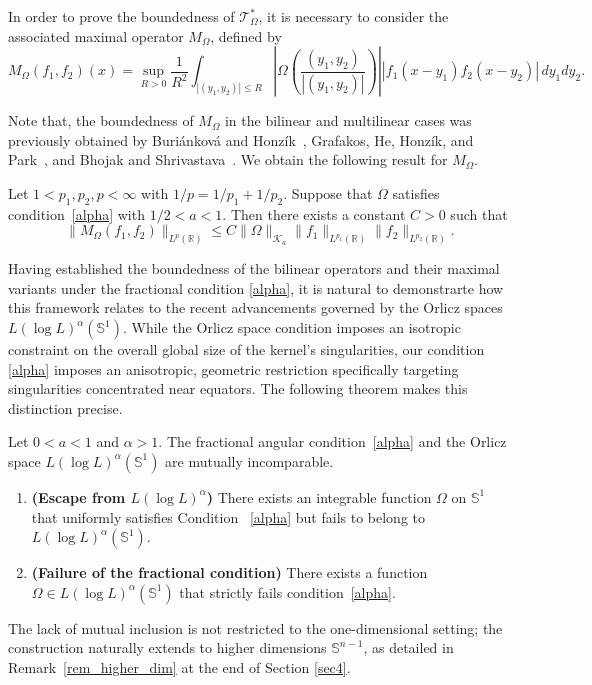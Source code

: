 \documentclass[11pt]{amsart}
\begin{document}
In order to prove the boundedness of $\mathcal {T}_\Omega^*$, it is necessary to consider the associated maximal operator $M_\Omega$, defined by
\[
M_\Omega(f_1, f_2)(x) = \sup_{R>0} \frac{1}{R^2} \int_{|(y_1, y_2)|
	\le R} \left| \Omega\left(\frac{(y_1, y_2)}{|(y_1, y_2)|}\right) \right| |f_1(x-y_1) f_2(x-y_2)| \, dy_1 dy_2.
\]

Note that, the boundedness of $M_\Omega$ in the bilinear and multilinear cases was previously obtained by Buri\'ankov\'a and Honz\'ik~\cite{BH19}, Grafakos, He, Honz\'ik, and Park~\cite{GHHP2024}, and Bhojak and Shrivastava~\cite{bhojak2025alternate}. 
We obtain the following result for $M_\Omega$.

\begin{theorem}\label{thmmax}
	Let $1 < p_1, p_2, p < \infty$ with $1/p = 1/p_1 + 1/p_2$.
	Suppose that $\Omega$ satisfies condition~\eqref{alpha} with $1/2 < a < 1$.
	Then there exists a constant $C > 0$ such that
	\[
	\|M_\Omega(f_1, f_2)\|_{L^p(\mathbb{R})} \le C \|\Omega\|_{\mathcal{K}_a} \|f_1\|_{L^{p_1}(\mathbb{R})} \|f_2\|_{L^{p_2}(\mathbb{R})}.
	\]
\end{theorem}

Having established the boundedness of the bilinear operators and their maximal variants under the fractional condition \eqref{alpha}, it is natural to demonstrarte how this framework relates to the recent advancements governed by the Orlicz spaces $L(\log L)^\alpha(\mathbb{S}^{1})$. While the Orlicz space condition imposes an isotropic constraint on the overall global size of the kernel's singularities, our condition \eqref{alpha} imposes an anisotropic, geometric restriction specifically targeting singularities concentrated near equators. The following theorem makes this distinction precise.

\begin{theorem}\label{thmincomparability}
	Let $0 < a < 1$ and $\alpha > 1$.
	The fractional angular condition~\eqref{alpha} and the Orlicz space $L(\log L)^\alpha(\mathbb{S}^{1})$ are mutually incomparable.
	\begin{enumerate}
		\item[\rm(i)] \textbf{(Escape from $L(\log L)^\alpha$)} There exists an integrable function $\Omega$ on $\mathbb{S}^{1}$ that uniformly satisfies Condition ~\eqref{alpha} but fails to belong to $L(\log L)^\alpha(\mathbb{S}^{1})$.
		\item[\rm(ii)] \textbf{(Failure of the fractional condition)} There exists a function $\Omega \in L(\log L)^\alpha(\mathbb{S}^{1})$ that strictly fails condition~\eqref{alpha}.
	\end{enumerate}
\end{theorem}
The lack of mutual inclusion is not restricted to the one-dimensional setting;
the construction naturally extends to higher dimensions $\mathbb{S}^{n-1}$, as detailed in Remark~\ref{rem_higher_dim} at the end of Section \ref{sec4}.
\end{document}
